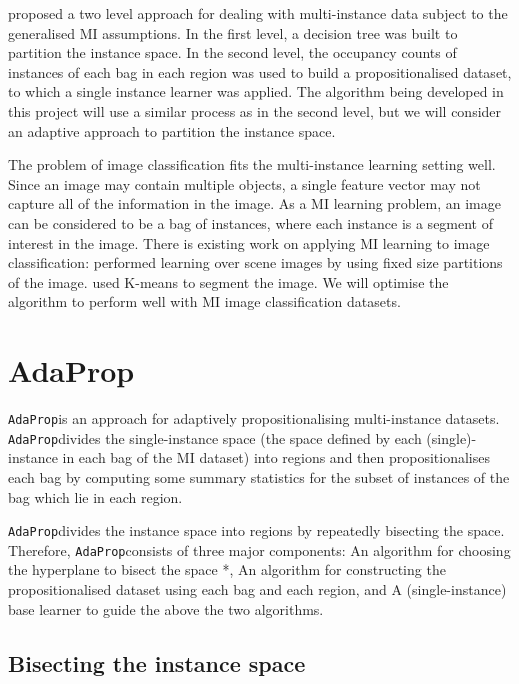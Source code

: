 \documentclass[a4paper,12pt]{article} %
\newcommand{\AdaProp}{\texttt{AdaProp\xspace}}
\begin{document}
 proposed a two level approach for dealing with multi-instance data subject to the generalised MI assumptions. In the first level, a decision tree was built to partition the instance space. In the second level, the occupancy counts of instances of each bag in each region was used to build a propositionalised dataset, to which a single instance learner was applied.
The algorithm being developed in this project will use a similar process as  in the second level, but we will consider an adaptive approach to partition the instance space.

The problem of image classification fits the multi-instance learning setting well. Since an image may contain multiple objects, a single feature vector may not capture all of the information in the image. As a MI learning problem, an image can be considered to be a bag of instances, where each instance is a segment of interest in the image. There is existing work on applying MI learning to image classification:  performed learning over scene images by using fixed size partitions of the image.  used K-means to segment the image. We will optimise the algorithm to perform well with MI image classification datasets.


\section{AdaProp}

\AdaProp is an approach for adaptively propositionalising multi-instance datasets.
\AdaProp divides the single-instance space
    (the space defined by each (single)-instance in each bag of the MI dataset)
    into regions and then
    propositionalises each bag by computing some summary statistics for the 
    subset of instances of the bag which lie in each region.

\AdaProp divides the instance space into regions
    by repeatedly bisecting the space.
Therefore, \AdaProp consists of three major components: 
    An algorithm for choosing the hyperplane to bisect the space *,
    An algorithm for constructing the propositionalised dataset 
        using each bag and each region, and
    A (single-instance) base learner to guide the above the two algorithms.

\subsection{Bisecting the instance space}
\end{document}
